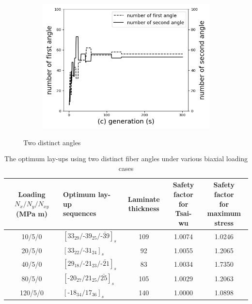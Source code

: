 \begin{figure}[!htb]
		\begin{subfigure}[b]{0.8\linewidth}
			\includegraphics[width=\linewidth]{2020-11-10-pre-image/two_distinct_angler_number_change.png}
		\end{subfigure}
	\caption{Two distinct angles}
	\label{fig:two_angles}
\end{figure}


\begin{table}
	\normalsize
\caption{The optimum lay-ups using two distinct fiber angles under various biaxial loading cases}
\label{tab:two_distinct_angle}
\centering
\begin{tabular}{clccc}
	\toprule
	\textbf{Loading} $N_{x}/N_{y}/N_{xy}$ \textbf{(MPa m)}   &
	\makecell{\textbf{Optimum lay-up } \\ \textbf{sequences}  }                        &
	\textbf{Laminate thickness} &  \makecell{\textbf{Safety factor } \\
	\textbf{for Tsai-wu}}  &
	\makecell{\textbf{Safety factor } \\ \textbf{for  maximum stress}}
	 \\
	\midrule
	10/5/0                                         &  $[33_{29}/\text{-}39_{25}/\bar{\text{-}39}]_s$            &     109               &  1.0074      &  1.0246  \\
	20/5/0                                         &  $[33_{22}/\text{-}31_{24}]_s$                             &     92               &  1.0055       &  1.2065    \\
	40/5/0                                         &  $[29_{18}/\text{-}21_{23}/\bar{\text{-}21}]_s$            &     83               &  1.0034       &  1.7350   \\
	80/5/0                                         &  $[\text{-}20_{27}/21_{25}/\bar{25}]_s$                    &     105               &  1.0029      &  1.2063    \\
	120/5/0                                         &  $[\text{-}18_{34}/17_{36}]_s$                            &     140               &  1.0000      &  1.0898    \\
	\bottomrule
\end{tabular}
\end{table}

